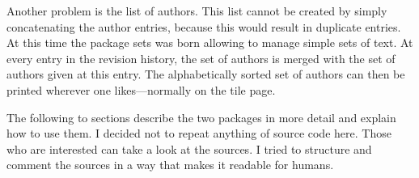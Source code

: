 Another problem is the list of authors. This list cannot be created by simply concatenating the author entries, because this would result in duplicate entries. At this time the package sets was born allowing to manage simple sets of text. At every entry in the revision history, the set of authors is merged with the set of authors given at this entry. The alphabetically sorted set of authors can then be printed wherever one likes---normally on the tile page.

The following to sections describe the two packages in more detail and explain how to use them. I decided not to repeat anything of source code here. Those who are interested can take a look at the sources. I tried to structure and comment the sources in a way that makes it readable for humans.
